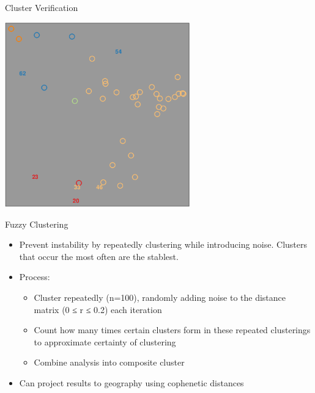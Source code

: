 \documentclass[presentation]{beamer}
\begin{document}
\begin{frame}[label={sec:org3a12f0e}]{Cluster Verification}
\begin{center}
\includegraphics[width=0.6\textwidth]{plot_wa_8_2_3_6_7_8.png}
\end{center}
\end{frame}
\begin{frame}[label={sec:org2591b24}]{Fuzzy Clustering}
\textcite{nerbonne2008projectingdialect}
\begin{itemize}
\item Prevent instability by repeatedly clustering while introducing noise. Clusters that occur the most often are the stablest.
\item Process:
\begin{itemize}
\item Cluster repeatedly (n=100), randomly adding noise to the distance matrix (0 ≤ r ≤ 0.2) each iteration
\item Count how many times certain clusters form in these repeated clusterings to approximate certainty of clustering
\item Combine analysis into composite cluster
\end{itemize}
\item Can project results to geography using cophenetic distances
\end{itemize}
\end{frame}
\end{document}

